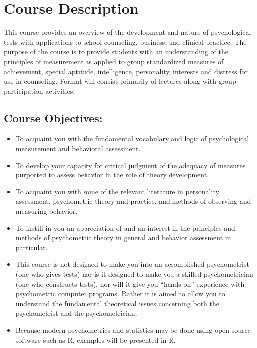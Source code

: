 \documentclass[
]{book}
\providecommand{\tightlist}{%
  \setlength{\itemsep}{0pt}\setlength{\parskip}{0pt}}
\begin{document}
\hypertarget{course-description-2}{%
\section{Course Description}\label{course-description-2}}

This course provides an overview of the development and nature of psychological tests with applications to school counseling, business, and clinical practice. The purpose of the course is to provide students with an understanding of the principles of measurement as applied to group standardized measures of achievement, special aptitude, intelligence, personality, interests and distress for use in counseling. Format will consist primarily of lectures along with group participation activities.

\hypertarget{course-objectives}{%
\subsection{Course Objectives:}\label{course-objectives}}

\begin{itemize}
\tightlist
\item
  To acquaint you with the fundamental vocabulary and logic of psychological measurement and behavioral assessment.
\item
  To develop your capacity for critical judgment of the adequacy of measures purported to assess behavior in the role of theory development.
\item
  To acquaint you with some of the relevant literature in personality assessment, psychometric theory and practice, and methods of observing and measuring behavior.
\item
  To instill in you an appreciation of and an interest in the principles and methods of psychometric theory in general and behavior assessment in particular.
\item
  This course is not designed to make you into an accomplished psychometrist (one who gives tests) nor is it designed to make you a skilled psychometrician (one who constructs tests), nor will it give you ``hands on'' experience with psychometric computer programs. Rather it is aimed to allow you to understand the fundamental theoretical issues concerning both the psychometrist and the psychometrician.
\item
  Because modern psychometrics and statistics may be done using open source software such as R, examples will be presented in R.
\end{itemize}
\end{document}
